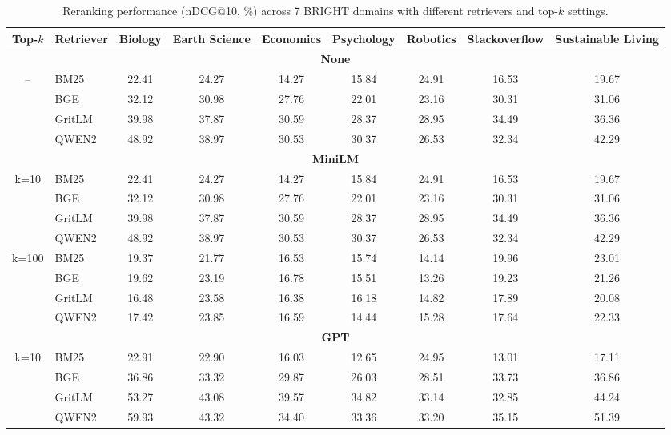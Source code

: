\documentclass[11pt]{article}
\begin{document}
\begin{table}[h]
\centering
\caption{Reranking performance (nDCG@10, \%) across 7 BRIGHT domains with different retrievers and top-$k$ settings.}
\label{tab:rerank-results}
\footnotesize
\begin{adjustbox}{max width=\textwidth}
\begin{tabular}{clccccccc}
\toprule
\textbf{Top-$k$} & \textbf{Retriever} & Biology & Earth Science & Economics & Psychology & Robotics & Stackoverflow & Sustainable Living \\
\midrule
\multicolumn{9}{c}{\textbf{None}} \\
\midrule
\multirow{4}{*}{--}  
  & BM25   & 22.41 & 24.27 & 14.27 & 15.84 & 24.91 & 16.53 & 19.67 \\
  & BGE    & 32.12 & 30.98 & 27.76 & 22.01 & 23.16 & 30.31 & 31.06 \\
  & GritLM & 39.98 & 37.87 & 30.59 & 28.37 & 28.95 & 34.49 & 36.36 \\
  & QWEN2  & 48.92 & 38.97 & 30.53 & 30.37 & 26.53 & 32.34 & 42.29 \\
\midrule
\multicolumn{9}{c}{\textbf{MiniLM}} \\
\midrule
\multirow{4}{*}{k=10}  
  & BM25   & 22.41 & 24.27 & 14.27 & 15.84 & 24.91 & 16.53 & 19.67 \\
  & BGE    & 32.12 & 30.98 & 27.76 & 22.01 & 23.16 & 30.31 & 31.06 \\
  & GritLM & 39.98 & 37.87 & 30.59 & 28.37 & 28.95 & 34.49 & 36.36 \\
  & QWEN2  & 48.92 & 38.97 & 30.53 & 30.37 & 26.53 & 32.34 & 42.29 \\
\midrule
\multirow{4}{*}{k=100} 
  & BM25   & 19.37 & 21.77 & 16.53 & 15.74 & 14.14 & 19.96 & 23.01 \\
  & BGE    & 19.62 & 23.19 & 16.78 & 15.51 & 13.26 & 19.23 & 21.26 \\
  & GritLM & 16.48 & 23.58 & 16.38 & 16.18 & 14.82 & 17.89 & 20.08 \\
  & QWEN2  & 17.42 & 23.85 & 16.59 & 14.44 & 15.28 & 17.64 & 22.33 \\
\midrule
\multicolumn{9}{c}{\textbf{GPT}} \\
\midrule
\multirow{4}{*}{k=10} 
  & BM25   & 22.91 & 22.90 & 16.03 & 12.65 & 24.95 & 13.01 & 17.11 \\
  & BGE    & 36.86 & 33.32 & 29.87 & 26.03 & 28.51 & 33.73 & 36.86 \\
  & GritLM & 53.27 & 43.08 & 39.57 & 34.82 & 33.14 & 32.85 & 44.24 \\
  & QWEN2  & 59.93 & 43.32 & 34.40 & 33.36 & 33.20 & 35.15 & 51.39 \\ 
\bottomrule
\end{tabular}
\end{adjustbox}
\end{table}
\end{document}
